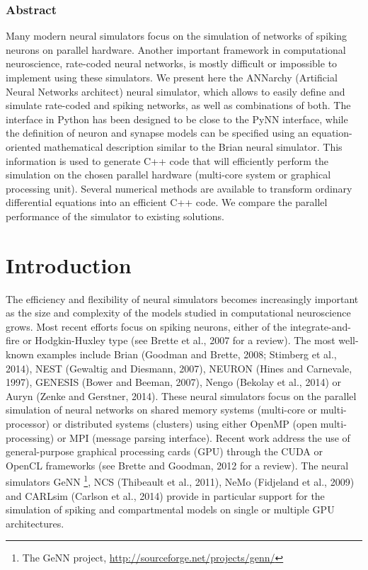 \documentclass[
  11pt,
  a4paper,
]{scrbook}
\begin{document}

\subsubsection*{Abstract}\label{abstract-5}

Many modern neural simulators focus on the simulation of networks of
spiking neurons on parallel hardware. Another important framework in
computational neuroscience, rate-coded neural networks, is mostly
difficult or impossible to implement using these simulators. We present
here the ANNarchy (Artificial Neural Networks architect) neural
simulator, which allows to easily define and simulate rate-coded and
spiking networks, as well as combinations of both. The interface in
Python has been designed to be close to the PyNN interface, while the
definition of neuron and synapse models can be specified using an
equation-oriented mathematical description similar to the Brian neural
simulator. This information is used to generate C++ code that will
efficiently perform the simulation on the chosen parallel hardware
(multi-core system or graphical processing unit). Several numerical
methods are available to transform ordinary differential equations into
an efficient C++ code. We compare the parallel performance of the
simulator to existing solutions.

\section{Introduction}\label{introduction-4}

The efficiency and flexibility of neural simulators becomes increasingly
important as the size and complexity of the models studied in
computational neuroscience grows. Most recent efforts focus on spiking
neurons, either of the integrate-and-fire or Hodgkin-Huxley type (see
Brette et al., 2007 for a review). The most well-known examples include
Brian (Goodman and Brette, 2008; Stimberg et al., 2014), NEST (Gewaltig
and Diesmann, 2007), NEURON (Hines and Carnevale, 1997), GENESIS (Bower
and Beeman, 2007), Nengo (Bekolay et al., 2014) or Auryn (Zenke and
Gerstner, 2014). These neural simulators focus on the parallel
simulation of neural networks on shared memory systems (multi-core or
multi-processor) or distributed systems (clusters) using either OpenMP
(open multi-processing) or MPI (message parsing interface). Recent work
address the use of general-purpose graphical processing cards (GPU)
through the CUDA or OpenCL frameworks (see Brette and Goodman, 2012 for
a review). The neural simulators GeNN \footnote{The GeNN project,
  \href{http://sourceforge.net/projects/genn}{http://sourceforge.net/projects/genn/}},
NCS (Thibeault et al., 2011), NeMo (Fidjeland et al., 2009) and CARLsim
(Carlson et al., 2014) provide in particular support for the simulation
of spiking and compartmental models on single or multiple GPU
architectures.
\end{document}
